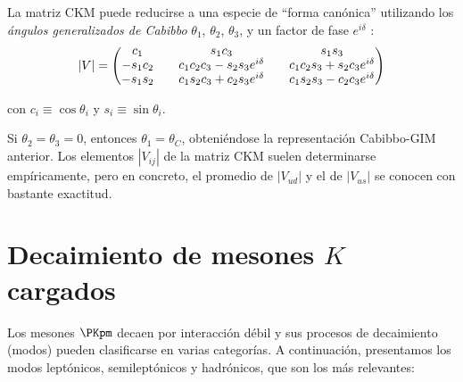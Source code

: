 La matriz CKM puede reducirse a una especie de ``forma canónica'' utilizando los \textit{ángulos generalizados de Cabibbo} $\theta_{1}$, $\theta_{2}$, $\theta_{3}$, y un factor de fase $e^{i\delta}$ \cite{Griffiths2008}:
\begin{equation}
\begingroup 
\renewcommand*{\arraystretch}{0.8}
\setlength\arraycolsep{10pt}
|V|=
\begin{pmatrix} c_{1} & s_{1}c_{3} & s_{1}s_{3} \\ -s_{1}c_{2} & c_{1}c_{2}c_{3}-s_{2}s_{3}e^{i\delta } & c_{1}c_{2}s_{3}+s_{2}c_{3}e^{i\delta } \\ -s_{1}s_{2} & c_{1}s_{2}c_{3}+c_{2}s_{3}e^{i\delta } & c_{1}s_{2}s_{3}-c_{2}c_{3}e^{i\delta } \end{pmatrix}
\endgroup
\end{equation}

con $c_{i}\equiv \cos \theta _{i}$ y $s_{i}\equiv \sin \theta _{i}$.

Si $\theta _{2}=\theta _{3}=0$, entonces $\theta _{1}=\theta _{C}$, obteniéndose la representación Cabibbo-GIM anterior. Los elementos $|V_{ij}|$ de la matriz CKM suelen determinarse empíricamente, pero en concreto, el promedio de $|V_{ud}|$ y el de $|V_{us}|$ se conocen con bastante exactitud.\\

\section{Decaimiento de mesones $K$ cargados}
\label{sec:charged_kaon_decay}
Los mesones $\PKpm$ decaen por interacción débil y sus procesos de decaimiento (modos) pueden clasificarse en varias categorías. A continuación, presentamos los modos leptónicos, semileptónicos y hadrónicos, que son los más relevantes:

